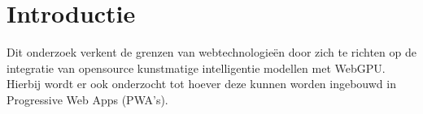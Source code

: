 
\section{Introductie}%
\label{sec:introductie}







Dit onderzoek verkent de grenzen van webtechnologieën door zich te richten op de integratie van opensource kunstmatige intelligentie modellen met WebGPU. Hierbij wordt er ook onderzocht tot hoever deze kunnen worden ingebouwd in Progressive Web Apps (PWA's). 

